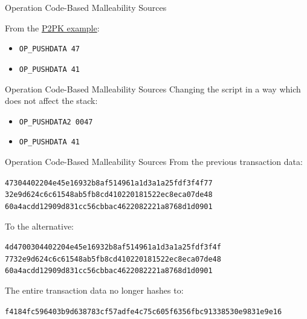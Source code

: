 \documentclass[]{beamer}
\begin{document}
\begin{frame}{Operation Code-Based Malleability Sources}
	\begin{scriptsize}
		From the \href{https://cryptolectures.teachable.com/courses/bitcoin-blockchain-and-cryptoassets/lectures/30728695}{\link P2PK example}:
	\end{scriptsize}
	\begin{itemize}
		\item<1->[1.] \texttt{OP\_PUSHDATA 47}
		\item<2->[2.] \texttt{OP\_PUSHDATA 41}
	\end{itemize}
	\vspace{1em}

	\begin{figure}
			
	\end{figure}
\end{frame}

\begin{frame}{Operation Code-Based Malleability Sources}
	Changing the script in a way which does not affect the stack:
	\begin{itemize}
		\item<1->[1.] \texttt{\alert{OP\_PUSHDATA2 0047}}
		\item<2->[2.] \texttt{OP\_PUSHDATA 41}
	\end{itemize}
	\vspace{1.5em}

	\begin{figure}
			
	\end{figure}
\end{frame}

\begin{frame}{Operation Code-Based Malleability Sources}
From the previous transaction data:\\
\begin{scriptsize}
	\texttt{\textcolor{focus}{47}304402204e45e16932b8af514961a1d3a1a25fdf3f4f77
	32e9d624c6c61548ab5fb8cd410220181522ec8eca07de48
	60a4acdd12909d831cc56cbbac4622082221a8768d1d0901}\\
\end{scriptsize}
\vspace{1em}
To the alternative:\\
\begin{scriptsize}
	\texttt{\textcolor{focus}{4d4700}304402204e45e16932b8af514961a1d3a1a25fdf3f4f
	7732e9d624c6c61548ab5fb8cd410220181522ec8eca07de48
	60a4acdd12909d831cc56cbbac4622082221a8768d1d0901}\\
\end{scriptsize}
\vspace{1em}
The entire transaction data \alert{no longer} hashes to:\\
\begin{scriptsize}
	\texttt{f4184fc596403b9d638783cf57adfe4c75c605f6356fbc91338530e9831e9e16}
\end{scriptsize}
\end{frame}
\end{document}

